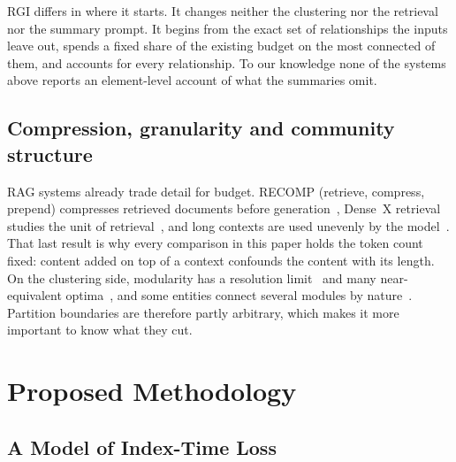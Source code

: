 \documentclass{ieeeaccess}
\theoremstyle{remark}
\begin{document}
RGI differs in where it starts. It changes neither the clustering nor the retrieval nor the summary prompt. It begins from the exact set of relationships the inputs leave out, spends a fixed share of the existing budget on the most connected of them, and accounts for every relationship. To our knowledge none of the systems above reports an element-level account of what the summaries omit.

\subsection{Compression, granularity and community structure}
RAG systems already trade detail for budget. RECOMP (retrieve, compress, prepend) compresses retrieved documents before generation~\cite{xu2024recomp}, Dense~X retrieval studies the unit of retrieval~\cite{chen2024densex}, and long contexts are used unevenly by the model~\cite{liu2024lost}. That last result is why every comparison in this paper holds the token count fixed: content added on top of a context confounds the content with its length. On the clustering side, modularity has a resolution limit~\cite{fortunato2007resolution} and many near-equivalent optima~\cite{good2010modularity,fortunato2010community}, and some entities connect several modules by nature~\cite{guimera2005cartography}. Partition boundaries are therefore partly arbitrary, which makes it more important to know what they cut.

\section{Proposed Methodology}\label{sec:method}

\subsection{A Model of Index-Time Loss}\label{sec:model}
\end{document}

